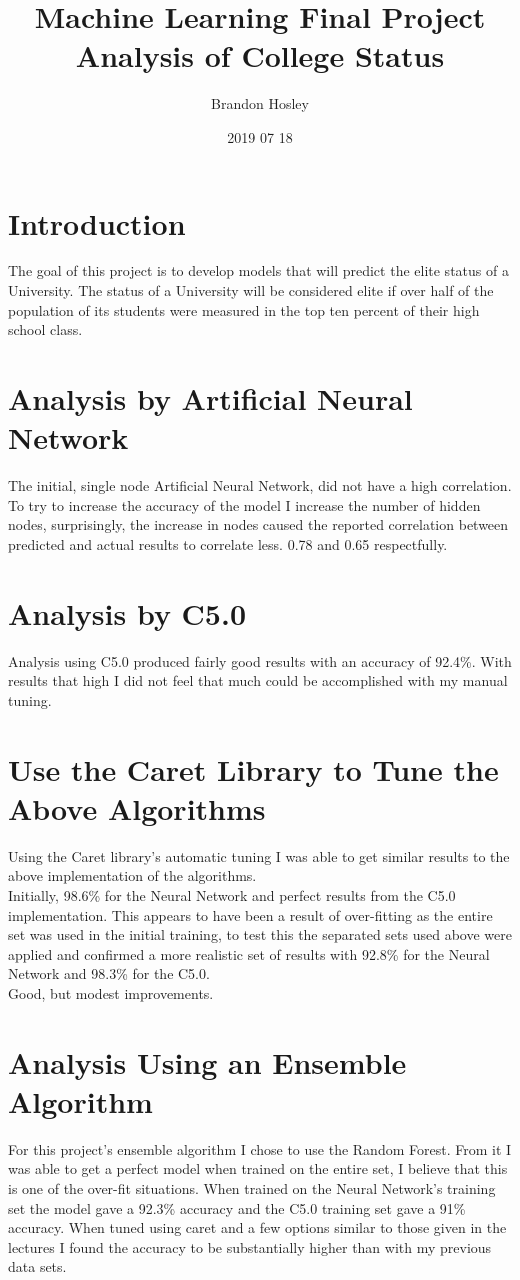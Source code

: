 \documentclass[a4paper,man,natbib]{apa6}
\title{Machine Learning Final Project \\ Analysis of College Status}
\author{Brandon Hosley}
\date{2019 07 18}
\affiliation{Dr. Svet Braynov}
\begin{document}
\maketitle
\section{Introduction}
The goal of this project is to develop models that will predict the elite status of a University. The status of a University will be considered elite if over half of the population of its students were measured in the top ten percent of their high school class. 
\section{Analysis by Artificial Neural Network}
The initial, single node Artificial Neural Network, did not have a high correlation. To try to increase the accuracy of the model I increase the number of hidden nodes, surprisingly, the increase in nodes caused the reported correlation between predicted and actual results to correlate less. 0.78 and 0.65 respectfully.
\section{Analysis by C5.0}
Analysis using C5.0 produced fairly good results with an accuracy of 92.4\%. With results that high I did not feel that much could be accomplished with my manual tuning. 
\section{Use the Caret Library to Tune the Above Algorithms}
Using the Caret library's automatic tuning I was able to get similar results to the above implementation of the algorithms. \\
Initially, 98.6\% for the Neural Network and perfect results from the C5.0 implementation. This appears to have been a result of over-fitting as the entire set was used in the initial training, to test this the separated sets used above were applied and confirmed a more realistic set of results with 
92.8\% for the Neural Network and
98.3\% for the C5.0. \\
Good, but modest improvements.
\section{Analysis Using an Ensemble Algorithm}
For this project's ensemble algorithm I chose to use the Random Forest. From it I was able to get a perfect model when trained on the entire set, I believe that this is one of the over-fit situations. When trained on the Neural Network's training set the model gave a 92.3\% accuracy
and the C5.0 training set gave a 91\% accuracy. 
When tuned using caret and a few options similar to those given in the lectures I found the accuracy to be substantially higher than with my previous data sets.
\end{document}
